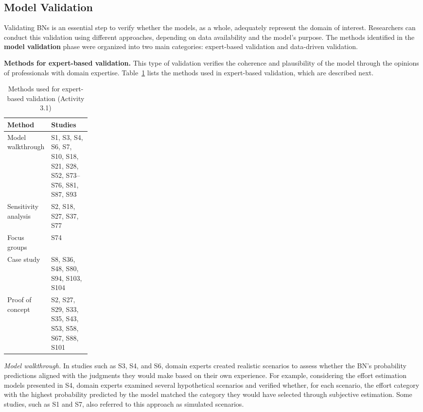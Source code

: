 \subsection{Model Validation}

Validating BNs is an essential step to verify whether the models, as a whole, adequately represent the domain of interest. Researchers can conduct this validation using different approaches, depending on data availability and the model's purpose. The methods identified in the \textbf{model validation} phase were organized into two main categories: expert-based validation and data-driven validation.

\vspace*{0.5\baselineskip}
\textbf{Methods for expert-based validation.} This type of validation verifies the coherence and plausibility of the model through the opinions of professionals with domain expertise. Table~\ref{tab:metodos_validacao_especialistas} lists the methods used in expert-based validation, which are described next.

\begin{table}[t]
\caption{Methods used for expert-based validation (Activity 3.1)}
\label{tab:metodos_validacao_especialistas}
\centering
\small
\setlength{\tabcolsep}{6pt}
\renewcommand{\arraystretch}{1.2}

\begin{tabularx}{0.75\linewidth}{>{\raggedright\arraybackslash}p{0.20\linewidth}
                              >{\raggedright\arraybackslash}X}
\toprule
\textbf{Method} & \textbf{Studies} \\
\midrule
Model walkthrough
& S1, S3, S4, S6, S7, S10, S18, S21, S28, S52, S73--S76, S81, S87, S93 \\
Sensitivity analysis
& S2, S18, S27, S37, S77 \\
Focus groups
& S74 \\
Case study
& S8, S36, S48, S80, S94, S103, S104 \\
Proof of concept
& S2, S27, S29, S33, S35, S43, S53, S58, S67, S88, S101 \\
\bottomrule
\end{tabularx}
\end{table}

\textit{Model walkthrough.} In studies such as S3, S4, and S6, domain experts created realistic scenarios to assess whether the BN's probability predictions aligned with the judgments they would make based on their own experience. For example, considering the effort estimation models presented in S4, domain experts examined several hypothetical scenarios and verified whether, for each scenario, the effort category with the highest probability predicted by the model matched the category they would have selected through subjective estimation. Some studies, such as S1 and S7, also referred to this approach as simulated scenarios.

